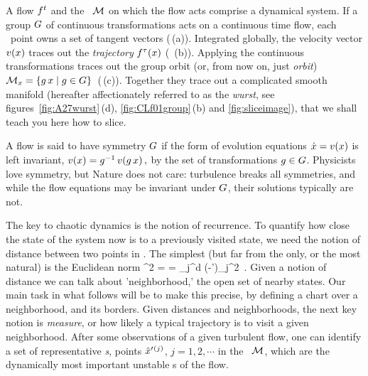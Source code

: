 A flow $f^t$ and the \statesp\ ${\cal M}$ on which the flow acts comprise a
{dynamical system}. If a group $G$ of continuous transformations
acts on a continuous time flow, each \statesp\ point owns a set of
tangent vectors (\,(a)). Integrated globally, the
velocity vector $v(x)$ traces out the {\em trajectory}
${f^{\tau}(x)}$ ( \,(b)). Applying the continuous
transformations traces out the {group orbit} (or, from now on, just
\emph{orbit})
\(
{\cal M}_{x} = \{g\,x \mid g \in {\ensuremath{G}}\}
\,
\) %
(\,(c)). Together they trace out a complicated smooth
manifold (hereafter affectionately referred to as the {\em wurst}, see
figures~\ref{fig:A27wurst}\,(d), \ref{fig:CLf01group}\,(b) and
\ref{fig:sliceimage}), that we shall teach you here how to slice.

A flow is said to have symmetry $G$ if the form of evolution
equations $\dot{x} = v(x)$ is left invariant,
\(
v(x)=g^{-1} \, v(g \, x)
\,,
\) %
by the set of transformations $g \in {\ensuremath{G}}$. Physicists love
symmetry, but Nature does not care: turbulence breaks all symmetries,
and while the flow equations may be invariant under $G$, their
solutions typically are not.

The key to chaotic dynamics is the notion of recurrence. To quantify how
close the state of the system now is to a previously visited state, we
need the notion of distance between two points in \statesp. The simplest
(but far from the only, or the most natural) is the Euclidean norm
\beq
  ^2  =  =
\sum_j^d
(\ssp-\ssp')_j^2
\,.
Given a notion of distance we can talk about 'neighborhood,' the open set of
nearby states. Our main task in what follows will be to make this precise,
by defining a chart over a neighborhood, and its borders.
Given distances and neighborhoods,
the next key notion is  \emph{measure}, or how likely a typical
trajectory is to visit a given neighborhood. After some observations of a
given turbulent flow, one can identify a set of representative
\emph{\template s}, {points}
${\hat{x}'}{}^{(j)}$, $j=1,2,\cdots$ in the \statesp\ ${\cal M}$, which are the
dynamically most important unstable {\recurrStr s} of the flow.

